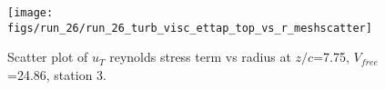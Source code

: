 \begin{figure}[H]
\centering
\texttt{[image: figs/run\_26/run\_26\_turb\_visc\_ettap\_top\_vs\_r\_meshscatter]}
\caption{Scatter plot of $
u_T$ reynolds stress term vs radius at $z/c$=7.75, $V_{free}$=24.86, station 3.}
\label{fig:run_26_turb_visc_ettap_top_vs_r_meshscatter}
\end{figure}


